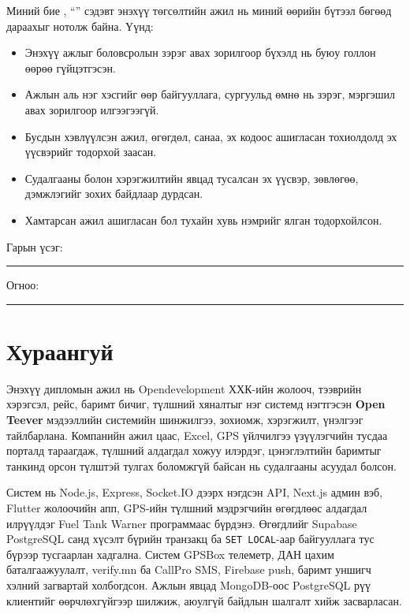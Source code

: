 \documentclass[
12pt,
oneside,
english,
onehalfspacing,
nolistspacing,
headsepline,
]{MUST-Thesis}
\newcommand{\authorshipname}{Зохиогч эрхийн хамгаалал}
\begin{document}
\begin{declaration}
\addchaptertocentry{\authorshipname}

\noindent Миний бие \shortname, ``\ttitle'' сэдэвт энэхүү төгсөлтийн ажил нь миний өөрийн бүтээл бөгөөд дараахыг нотолж байна. Үүнд:

\begin{itemize}
    \item Энэхүү ажлыг боловсролын зэрэг авах зорилгоор бүхэлд нь буюу голлон өөрөө гүйцэтгэсэн.
    \item Ажлын аль нэг хэсгийг өөр байгууллага, сургуульд өмнө нь зэрэг, мэргэшил авах зорилгоор илгээгээгүй.
    \item Бусдын хэвлүүлсэн ажил, өгөгдөл, санаа, эх кодоос ашигласан тохиолдолд эх үүсвэрийг тодорхой заасан.
    \item Судалгааны болон хэрэгжилтийн явцад тусалсан эх үүсвэр, зөвлөгөө, дэмжлэгийг зохих байдлаар дурдсан.
    \item Хамтарсан ажил ашигласан бол тухайн хувь нэмрийг ялган тодорхойлсон.
\end{itemize}
\bigskip

\noindent Гарын үсэг: \rule[-0.5em]{12.7em}{0.5pt}
\bigskip

\noindent Огноо: \rule[-0.5em]{15em}{0.5pt}
\end{declaration}

\clearpage


\chapter*{Хураангуй}

Энэхүү дипломын ажил нь Opendevelopment ХХК-ийн жолооч, тээврийн хэрэгсэл, рейс, баримт бичиг, түлшний хяналтыг нэг системд нэгтгэсэн \textbf{Open Teever} мэдээллийн системийн шинжилгээ, зохиомж, хэрэгжилт, үнэлгээг тайлбарлана. Компанийн ажил цаас, Excel, GPS үйлчилгээ үзүүлэгчийн тусдаа порталд тараагдаж, түлшний алдагдал хожуу илэрдэг, цэнэглэлтийн баримтыг танкинд орсон түлштэй тулгах боломжгүй байсан нь судалгааны асуудал болсон.

Систем нь Node.js, Express, Socket.IO дээрх нэгдсэн API, Next.js админ вэб, Flutter жолоочийн апп, GPS-ийн түлшний мэдрэгчийн өгөгдлөөс алдагдал илрүүлдэг Fuel Tank Warner программаас бүрдэнэ. Өгөгдлийг Supabase PostgreSQL санд хүсэлт бүрийн транзакц ба \texttt{SET LOCAL}-аар байгууллага тус бүрээр тусгаарлан хадгална. Систем GPSBox телеметр, ДАН цахим баталгаажуулалт, verify.mn ба CallPro SMS, Firebase push, баримт уншигч хэлний загвартай холбогдсон. Ажлын явцад MongoDB-оос PostgreSQL рүү клиентийг өөрчлөхгүйгээр шилжиж, аюулгүй байдлын шалгалт хийж засварласан.
\end{document}
